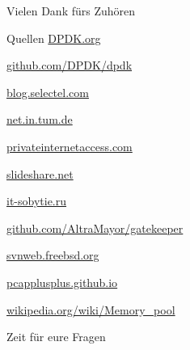 \documentclass{beamer}
\begin{document}
\begin{frame}[focus]
    Vielen Dank fürs Zuhören
\end{frame}
\appendix
\begin{frame}{Quellen}
    \href{https://www.dpdk.org/}{DPDK.org}

    \href{https://github.com/DPDK/dpdk}{github.com/DPDK/dpdk}

    \href{https://blog.selectel.com/introduction-dpdk-architecture-principles/}{blog.selectel.com}

    \href{https://www.net.in.tum.de/fileadmin/TUM/NET/NET-2014-08-1/NET-2014-08-1_15.pdf}{net.in.tum.de}

    \href{https://www.privateinternetaccess.com/blog/2016/01/linux-networking-stack-from-the-ground-up-part-1}{privateinternetaccess.com}

    \href{http://www.slideshare.net/garyachy/dpdk-44585840}{slideshare.net}

    \href{http://www.it-sobytie.ru/system/attachments/files/000/001/102/original/LinuxPiter-DPDK-2015.pdf}{it-sobytie.ru}

    \href{https://github.com/AltraMayor/gatekeeper/wiki}{github.com/AltraMayor/gatekeeper}

    \href{https://svnweb.freebsd.org}{svnweb.freebsd.org}

    \href{https://pcapplusplus.github.io/}{pcapplusplus.github.io}

    \href{https://en.wikipedia.org/wiki/Memory_pool}{wikipedia.org/wiki/Memory\_pool}

    \nocite{*} %
    
    
\end{frame}

\begin{frame}[focus]
    Zeit für eure Fragen
\end{frame}
\end{document}
